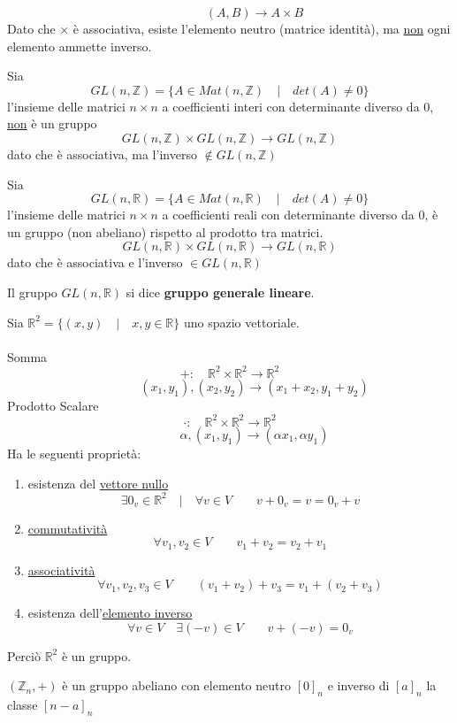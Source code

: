 \documentclass[a4paper,12pt, oneside]{book}
\begin{document}
\begin{shaded}
\begin{esempio}
					$$ \qquad \qquad (A,B) \rightarrow A \times B$$
					Dato che $\times$ è associativa, esiste l'elemento neutro (matrice identità), ma \underline{non} ogni elemento ammette inverso.
				\end{esempio}
				\begin{esempio}
					Sia $$GL(n, \mathbb{Z}) = \{ A \in Mat(n, \mathbb{Z}) \quad | \quad det(A) \not = 0 \}$$ l'insieme delle matrici $n \times n$ a coefficienti interi con determinante diverso da $0$, \underline{non} è un gruppo
					$$GL(n, \mathbb{Z}) \times GL(n, \mathbb{Z}) \rightarrow GL(n, \mathbb{Z})$$
					dato che è associativa, ma l'inverso $\not\in GL(n, \mathbb{Z})$
				\end{esempio}
				\begin{esempio}
					Sia $$GL(n, \mathbb{R}) = \{ A \in Mat(n, \mathbb{R}) \quad | \quad det(A) \not = 0 \}$$ l'insieme delle matrici $n \times n$ a coefficienti reali con determinante diverso da $0$, è un gruppo (non abeliano) rispetto al prodotto tra matrici.
					$$GL(n, \mathbb{R}) \times GL(n, \mathbb{R}) \rightarrow GL(n, \mathbb{R})$$
					dato che è associativa e l'inverso $\in GL(n, \mathbb{R})$
					\begin{nota}
						Il gruppo $GL(n, \mathbb{R})$ si dice \textbf{gruppo generale lineare}.
					\end{nota}
				\end{esempio}
				\begin{esempio}
					Sia $\mathbb{R}^2 = \{ (x,y) \quad | \quad x,y \in \mathbb{R} \}$ uno spazio vettoriale.\\\\
					Somma
					$$+: \quad \mathbb{R}^2 \times \mathbb{R}^2 \rightarrow \mathbb{R}^2$$
					$$ \qquad \qquad (x_1,y_1), (x_2,y_2) \rightarrow (x_1+x_2, y_1+y_2)$$
					Prodotto Scalare
					$$\cdot: \quad \mathbb{R}^2 \times \mathbb{R}^2 \rightarrow \mathbb{R}^2$$
					$$ \qquad \qquad \alpha, (x_1,y_1) \rightarrow (\alpha x_1, \alpha y_1)$$
					Ha le seguenti proprietà:
					\begin{enumerate}
						\item esistenza del \underline{vettore nullo} $$\exists 0_v \in \mathbb{R}^2 \quad | \quad \forall v \in V \qquad v+0_v = v = 0_v+v$$
						\item \underline{commutatività} $$\forall v_1,v_2 \in V \qquad v_1+v_2=v_2+v_1$$
						\item \underline{associatività} $$\forall v_1,v_2,v_3 \in V \qquad (v_1+v_2)+v_3=v_1+(v_2+v_3)$$
						\item esistenza dell'\underline{elemento inverso} $$\forall v \in V \quad \exists (-v) \in V \qquad v+(-v) = 0_v$$
					\end{enumerate}
					Perciò $\mathbb{R}^2$ è un gruppo.
				\end{esempio}
				\begin{esempio}
					$(\mathbb{Z}_n, +)$ è un gruppo abeliano con elemento neutro $[0]_n$ e inverso di $[a]_n$ la classe $[n-a]_n$
				\end{esempio}
		\end{shaded}
	
\end{document}
